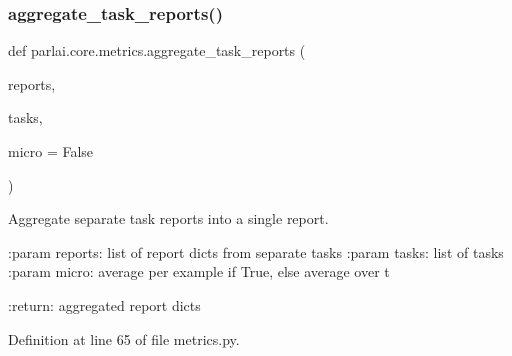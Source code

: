 \subsubsection{\texorpdfstring{aggregate\+\_\+task\+\_\+reports()}{aggregate\_task\_reports()}}
{\footnotesize\ttfamily def parlai.\+core.\+metrics.\+aggregate\+\_\+task\+\_\+reports (\begin{DoxyParamCaption}\item[{}]{reports,  }\item[{}]{tasks,  }\item[{}]{micro = {\ttfamily False} }\end{DoxyParamCaption})}

\begin{DoxyVerb}Aggregate separate task reports into a single report.

:param reports: list of report dicts from separate tasks
:param tasks: list of tasks
:param micro: average per example if True, else average over t

:return: aggregated report dicts
\end{DoxyVerb}
 

Definition at line 65 of file metrics.\+py.



